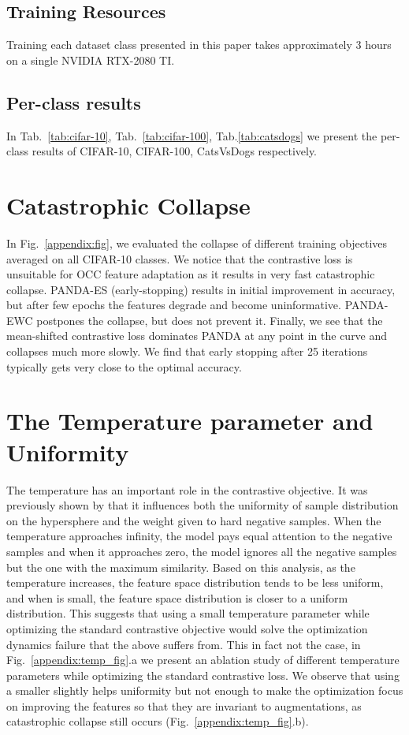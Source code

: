 \documentclass[letterpaper]{article} \usepackage{aaai23}  \usepackage{times}  \usepackage{helvet}  \usepackage{courier}  \usepackage[hyphens]{url}  \usepackage{graphicx} \usepackage{amsmath, amssymb}
\begin{document}
\subsection{Training Resources}
Training each dataset class presented in this paper takes approximately 3 hours on a single NVIDIA RTX-2080 TI.

\subsection{Per-class results}
\label{appendix:per_class}
In Tab.~\ref{tab:cifar-10}, Tab.~\ref{tab:cifar-100}, Tab.\ref{tab:catsdogs} we present the per-class results of CIFAR-10, CIFAR-100, CatsVsDogs respectively.

\section{Catastrophic Collapse}
\label{appendix:collapse}
In Fig.~\ref{appendix:fig}, we evaluated the collapse of different training objectives averaged on all CIFAR-10 classes. We notice that the contrastive loss is unsuitable for OCC feature adaptation as it results in very fast catastrophic collapse. PANDA-ES (early-stopping) results in initial improvement in accuracy, but after few epochs the features degrade and become uninformative. PANDA-EWC postpones the collapse, but does not prevent it. Finally, we see that the mean-shifted contrastive loss dominates PANDA at any point in the curve and collapses much more slowly. We find that early stopping after 25 iterations typically gets very close to the optimal accuracy. 

\section{The Temperature parameter and Uniformity}
\label{appendix:tau}
The temperature  has an important role in the contrastive objective. It was previously shown by \cite{wang2021understanding} that it influences both the uniformity of sample distribution on the hypersphere and the weight given to hard negative samples. When the temperature approaches infinity, the model pays equal attention to the negative samples and when it approaches zero, the model ignores all the negative samples but the one with the maximum similarity. Based on this analysis, as the temperature increases, the feature space distribution tends to be less uniform, and when  is small, the feature space distribution is closer to a uniform distribution. This suggests that using a small temperature parameter while optimizing the standard contrastive objective would solve the optimization dynamics failure that the above suffers from. This in fact not the case, in Fig.~\ref{appendix:temp_fig}.a we present an ablation study of different temperature parameters while optimizing the standard contrastive loss. We observe that using a smaller  slightly helps uniformity but not enough to make the optimization focus on improving the features so that they are invariant to augmentations, as catastrophic collapse still occurs (Fig.~\ref{appendix:temp_fig}.b).
\end{document}
